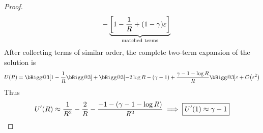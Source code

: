 \documentclass{article} %
\makeatletter
\theoremstyle{plain}
\newcommand{\BIGG}{\bBigg@{3}}
\newcommand{\E}{\varepsilon}
\numberwithin{equation}{section} %
\numberwithin{figure}{section} %
\numberwithin{table}{section} %
\makeatother
\begin{document}
\begin{proof}
\begin{align*}
        &\qquad - \underbrace{\qty[1 - \frac{1}{R} + \qty(1 - \gamma)\E]}_{\text{matched terms}}
    \end{align*}
    After collecting terms of similar order, the complete two-term expansion of the solution is
    \begin{align*}
        U(R) = \BIGG[1 - \frac{1}{R}\BIGG] + \BIGG[-2\log R - (\gamma - 1) + \frac{\gamma - 1 - \log R}{R}\BIGG]\E + \order{\E^2}
    \end{align*}
    Thus
    \begin{align*}
        U'(R) \approx \frac{1}{R^2} - \frac{2}{R} - \frac{-1 - \qty(\gamma - 1 - \log R)}{R^2} \implies \boxed{U'(1) \approx \gamma - 1}
    \end{align*}
\end{proof}
    
\end{document}
